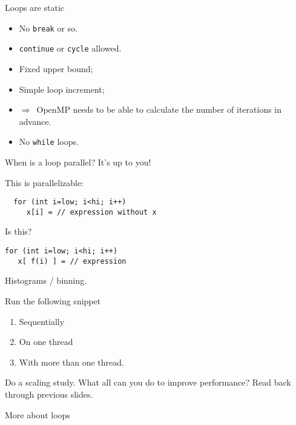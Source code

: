 \begin{numberedframe}{Loops are static}
  \begin{itemize}
  \item No \lstinline{break} or so.
  \item \lstinline{continue} or \lstinline{cycle} allowed.
  \item Fixed upper bound;
  \item Simple loop increment;
  \item $\Rightarrow$~OpenMP needs to be able to calculate
    the number of iterations in advance.
  \item No \lstinline{while} loops.
  \end{itemize}
\end{numberedframe}

\begin{numberedframe}{When is a loop parallel?}
  It's up to you!

  This is parallelizable:
\begin{lstlisting}
  for (int i=low; i<hi; i++)
     x[i] = // expression without x
\end{lstlisting}
Is this?
\begin{lstlisting}
for (int i=low; i<hi; i++)
   x[ f(i) ] = // expression
\end{lstlisting}
Histograms / binning.
\end{numberedframe}

\begin{exerciseframe}
  
\end{exerciseframe}

\begin{exerciseframe}[vectorsum]
  Run the following snippet
  \begin{enumerate}
  \item Sequentially
  \item On one thread
  \item With more than one thread.
  \end{enumerate}
  Do a scaling study.
  What all can you do to improve performance? Read back through previous slides.
\end{exerciseframe}

 {More about loops}

